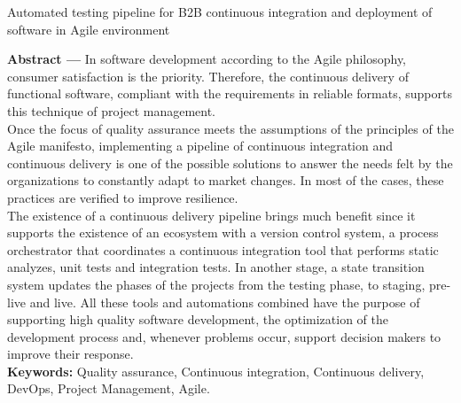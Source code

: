 
\begin{center}
\large{Automated testing pipeline for B2B continuous integration and deployment of software in Agile environment}

\vskip5mm 
 
\end{center}

\textbf{Abstract ---} 
In software development according to the Agile philosophy, consumer satisfaction is the priority. Therefore, the continuous delivery of functional software, compliant with the requirements in reliable formats, supports this technique of project management.\\ 

\hspace{1cm}Once the focus of quality assurance meets the assumptions of the principles of the Agile manifesto, implementing a pipeline of continuous integration and continuous delivery is one of the possible solutions to answer the needs felt by the organizations to constantly adapt to market changes. In most of the cases, these practices are verified to improve resilience.\\ 

\hspace{1cm}The existence of a continuous delivery pipeline brings much benefit since it supports the existence of an ecosystem with a version control system, a process orchestrator that coordinates a continuous integration tool that performs static analyzes, unit tests and integration tests. In another stage, a state transition system updates the phases of the projects from the testing phase, to staging, pre-live and live. All these tools and automations combined have the purpose of supporting high quality software development, the optimization of the development process and, whenever problems occur, support decision makers to improve their response.\\

\textbf{Keywords:} Quality assurance, Continuous integration, Continuous delivery, DevOps, Project Management, Agile.

